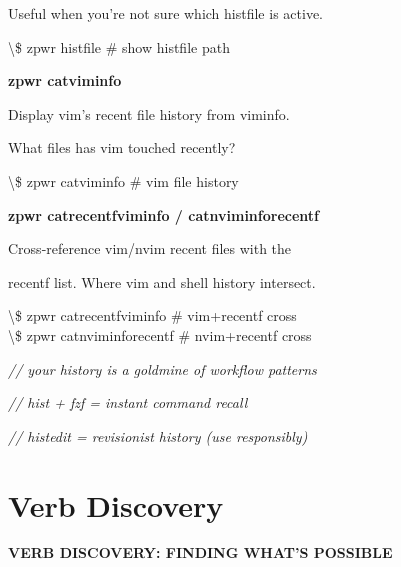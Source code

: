 \documentclass[11pt,a4paper,twoside]{book}
\begin{document}
Useful when you're not sure which histfile is active.

\begin{codebox}
\textbackslash{}\$ zpwr histfile               \# show histfile path\\
\end{codebox}


\vspace{12pt}
{\bfseries\color{neonyellow} zpwr catviminfo}\vspace{4pt}

Display vim's recent file history from viminfo.

What files has vim touched recently?

\begin{codebox}
\textbackslash{}\$ zpwr catviminfo             \# vim file history\\
\end{codebox}


\vspace{12pt}
{\bfseries\color{neonyellow} zpwr catrecentfviminfo / catnviminforecentf}\vspace{4pt}

Cross-reference vim/nvim recent files with the

recentf list. Where vim and shell history intersect.

\begin{codebox}
\textbackslash{}\$ zpwr catrecentfviminfo      \# vim+recentf cross\\
\textbackslash{}\$ zpwr catnviminforecentf     \# nvim+recentf cross\\
\end{codebox}

{\small\itshape\color{dimtext} // your history is a goldmine of workflow patterns}

{\small\itshape\color{dimtext} // hist + fzf = instant command recall}

{\small\itshape\color{dimtext} // histedit = revisionist history (use responsibly)}


\vspace{16pt}

\section{Verb Discovery}


\vspace{10pt}
{\large\bfseries\color{neoncyan} VERB DISCOVERY: FINDING WHAT'S POSSIBLE}\vspace{6pt}
\end{document}
